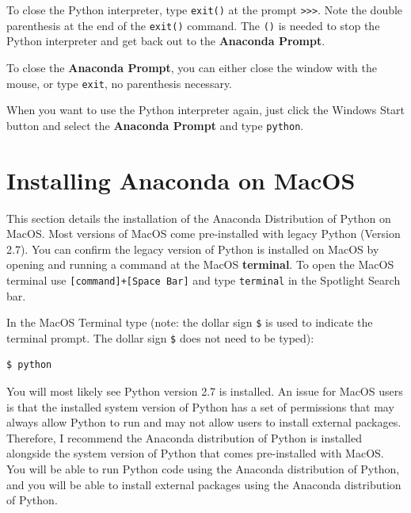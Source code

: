 \documentclass{book}
\begin{document}
To close the Python interpreter, type \lstinline!exit()! at the prompt
\lstinline!>>>!. Note the double parenthesis at the end of the
\lstinline!exit()! command. The \lstinline!()! is needed to stop the
Python interpreter and get back out to the \textbf{Anaconda Prompt}.

To close the \textbf{Anaconda Prompt}, you can either close the window
with the mouse, or type \lstinline!exit!, no parenthesis necessary.

When you want to use the Python interpreter again, just click the
Windows Start button and select the \textbf{Anaconda Prompt} and type
\lstinline!python!.
    




    
        \section{Installing Anaconda on
MacOS}\label{installing-anaconda-on-macos}
    




    
        This section details the installation of the Anaconda Distribution of
Python on MacOS. Most versions of MacOS come pre-installed with legacy
Python (Version 2.7). You can confirm the legacy version of Python is
installed on MacOS by opening and running a command at the MacOS
\textbf{terminal}. To open the MacOS terminal use
\lstinline![command]+[Space Bar]! and type \lstinline!terminal! in the
Spotlight Search bar.

In the MacOS Terminal type (note: the dollar sign \lstinline!$! is used
to indicate the terminal prompt. The dollar sign \lstinline!$! does not
need to be typed):

\begin{lstlisting}
$ python
\end{lstlisting}

You will most likely see Python version 2.7 is installed. An issue for
MacOS users is that the installed system version of Python has a set of
permissions that may always allow Python to run and may not allow users
to install external packages. Therefore, I recommend the Anaconda
distribution of Python is installed alongside the system version of
Python that comes pre-installed with MacOS. You will be able to run
Python code using the Anaconda distribution of Python, and you will be
able to install external packages using the Anaconda distribution of
Python.
\end{document}
